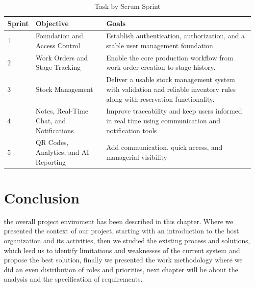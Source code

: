 \begin{table}[H]
    \caption{Task by Scrum Sprint} \label{tab:sprint-summary}
    \begin{tabular}{|p{1.5cm}|p{5.5cm}|p{7cm}|}
        \hline
        \textbf{Sprint} & \textbf{Objective} & \textbf{Goals} \\
        \hline
        1 & Foundation and Access \newline Control &  Establish authentication, \newline authorization, and a stable user management foundation\\
        \hline
        2 & Work Orders and Stage \newline Tracking & Enable the core production workflow from work order creation to stage history. \\
        \hline
        3 & Stock Management & Deliver a usable stock management system with validation and reliable inventory rules along with reservation functionality.\\
        \hline
        4 & Notes, Real-Time Chat,  and Notifications & Improve traceability and keep users informed in real time using communication and notification tools \\
        \hline
        5 & QR Codes, Analytics, and AI Reporting & Add communication, quick access, and managerial visibility  \\
        \hline
    \end{tabular}
\end{table}
\vspace{1cm}
\section*{Conclusion}

the overall project enviroment has been described in this chapter. Where we presented the context of our project,
starting with an introduction to the host organization and its activities,
then we studied the existing process and solutions, which leed us to identify limitations and weaknesses of the current system and propose the best solution,
finally we presented the work methodology where we did an even distribution of roles and priorities, next chapter will be about the analysis and the specification of requirements.
